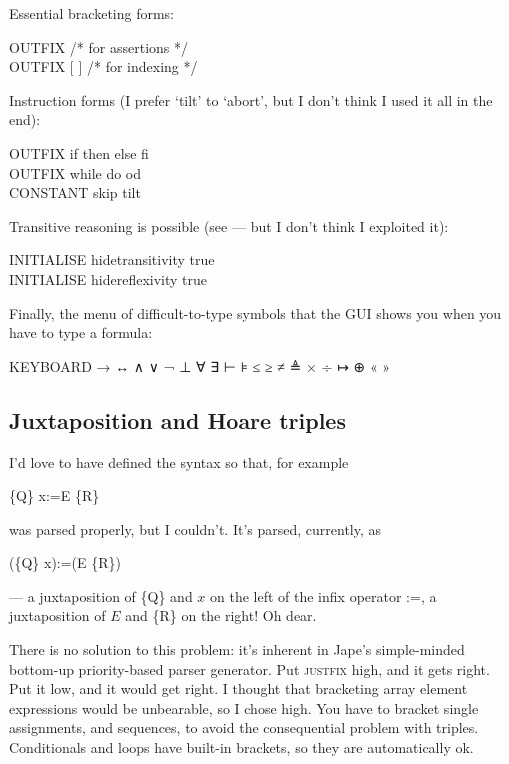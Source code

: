 Essential bracketing forms:
\begin{japeish}
OUTFIX { } /* for assertions */ \\
OUTFIX [ ] /* for indexing */
\end{japeish}

Instruction forms (I prefer `tilt' to `abort', but I don't think I used it all in the end):
\begin{japeish}
OUTFIX if then else fi \\
OUTFIX while do od \\
CONSTANT skip tilt
\end{japeish}

Transitive reasoning is possible (see  --- but I don't think I exploited it):
\begin{japeish}
INITIALISE hidetransitivity true \\
INITIALISE hidereflexivity true
\end{japeish}

Finally, the menu of difficult-to-type symbols that the GUI shows you when you have to type a formula:
\begin{japeish}
KEYBOARD → ↔ ∧ ∨ ¬ ⊥ ∀ ∃ ⊢ ⊧ ≤ ≥ ≠ ≜ × ÷ ↦ ⊕ « »
\end{japeish}

\subsection{Juxtaposition and Hoare triples}

I'd love to have defined the syntax so that, for example
\begin{japeish}
\{Q\} x:=E \{R\}
\end{japeish}
was parsed properly, but I couldn't. It's parsed, currently, as 
\begin{japeish}
(\{Q\} x):=(E \{R\})
\end{japeish}
--- a juxtaposition of \{Q\} and $x$ on the left of the infix operator :=, a juxtaposition of $E$ and \{R\} on the right! Oh dear.

There is no solution to this problem: it's inherent in Jape's simple-minded bottom-up priority-based parser generator. Put \textsc{justfix} high, and it gets  right. Put it low, and it would get  right. I thought that bracketing array element expressions would be unbearable, so I chose high. You have to bracket single assignments, and sequences, to avoid the consequential problem with triples. Conditionals and loops have built-in brackets, so they are automatically ok.

